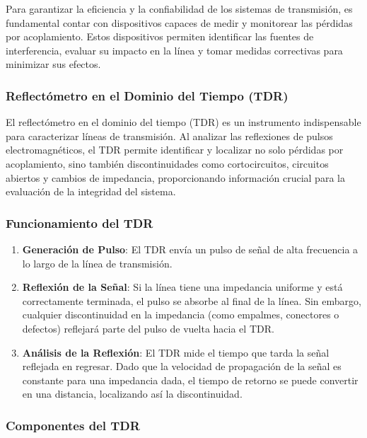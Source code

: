         Para garantizar la eficiencia y la confiabilidad de los sistemas de transmisión, es fundamental contar con dispositivos capaces de medir y monitorear las pérdidas por acoplamiento. Estos dispositivos permiten identificar las fuentes de interferencia, evaluar su impacto en la línea y tomar medidas correctivas para minimizar sus efectos.

        \subsubsection{Reflectómetro en el Dominio del Tiempo (TDR)}

            El reflectómetro en el dominio del tiempo (TDR) es un instrumento indispensable para caracterizar líneas de transmisión. Al analizar las reflexiones de pulsos electromagnéticos, el TDR permite identificar y localizar no solo pérdidas por acoplamiento, sino también discontinuidades como cortocircuitos, circuitos abiertos y cambios de impedancia, proporcionando información crucial para la evaluación de la integridad del sistema.

        \subsubsection*{Funcionamiento del TDR}

            \begin{enumerate}
                \item \textbf{Generación de Pulso}: El TDR envía un pulso de señal de alta frecuencia a lo largo de la línea de transmisión.
                \item \textbf{Reflexión de la Señal}: Si la línea tiene una impedancia uniforme y está correctamente terminada, el pulso se absorbe al final de la línea. Sin embargo, cualquier discontinuidad en la impedancia (como empalmes, conectores o defectos) reflejará parte del pulso de vuelta hacia el TDR.
                \item \textbf{Análisis de la Reflexión}: El TDR mide el tiempo que tarda la señal reflejada en regresar. Dado que la velocidad de propagación de la señal es constante para una impedancia dada, el tiempo de retorno se puede convertir en una distancia, localizando así la discontinuidad.
            \end{enumerate}

        \subsubsection*{Componentes del TDR}

